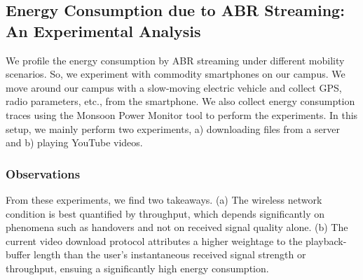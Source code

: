 \subsection{Energy Consumption due to ABR Streaming: An Experimental Analysis}
We profile the energy consumption by ABR streaming under different mobility scenarios. So, we experiment with commodity smartphones on our campus. We move around our campus with a slow-moving electric vehicle and collect GPS, radio parameters, etc., from the smartphone. We also collect energy consumption traces using the Monsoon Power Monitor tool to perform the experiments. In this setup, we mainly perform two experiments, a) downloading files from a server and b) playing YouTube videos.
\subsubsection{Observations}
From these experiments, we find two takeaways. (a) The wireless network condition is best quantified by throughput, which depends significantly on phenomena such as handovers and not on received signal quality alone. (b) The current video download protocol attributes a higher weightage to the playback-buffer length than the user's instantaneous received signal strength or throughput, ensuing a significantly high energy consumption.